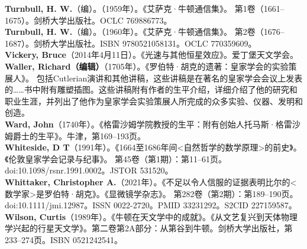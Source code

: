 \textbf{Turnbull, H. W.}（编）。（1959年）。《艾萨克·牛顿通信集》。 第1卷（1661–1675）。剑桥大学出版社。OCLC 769886773。\\
\textbf{Turnbull, H. W.}（编）。（1960年）。《艾萨克·牛顿通信集》。 第2卷（1676–1687）。剑桥大学出版社。ISBN 9780521058131。OCLC 770359609。\\
\textbf{Vickery, Bruce}（2014年4月11日）。《光速与其他恒星效应》。爱丁堡天文学会。\\
\textbf{Waller, Richard（编辑）}（1705年）。《罗伯特·胡克的遗著：皇家学会的实验策展人》。 包括Cutlerian演讲和其他讲稿，这些讲稿是在著名的皇家学会会议上发表的……书中附有雕塑插图。这些讲稿附有作者的生平介绍，详细介绍了他的研究和职业生涯，并列出了他作为皇家学会实验策展人所完成的众多实验、仪器、发明和创造。\\
\textbf{Ward, John}（1740年）。《格雷沙姆学院教授的生平：附有创始人托马斯·格雷沙姆爵士的生平》。牛津，第169–193页。\\
\textbf{Whiteside, D T}（1991年）。《1664至1686年间<自然哲学的数学原理>的前史》。《伦敦皇家学会记录与纪事》。 第45卷（第1期）：第11–61页。doi:10.1098/rsnr.1991.0002。JSTOR 531520。\\
\textbf{Whittaker, Christopher A.}（2021年）。《不足以令人信服的证据表明比尔的<数学家>是罗伯特·胡克》。《显微镜学杂志》。 第282卷（第2期）：第189–190页。doi:10.1111/jmi.12987。ISSN 0022-2720。PMID 33231292。S2CID 227159587。\\
\textbf{Wilson, Curtis}（1989年）。《牛顿在天文学中的成就》。《从文艺复兴到天体物理学兴起的行星天文学》。第二卷第2A部分：从第谷到牛顿。剑桥大学出版社，第233–274页。ISBN 0521242541。
